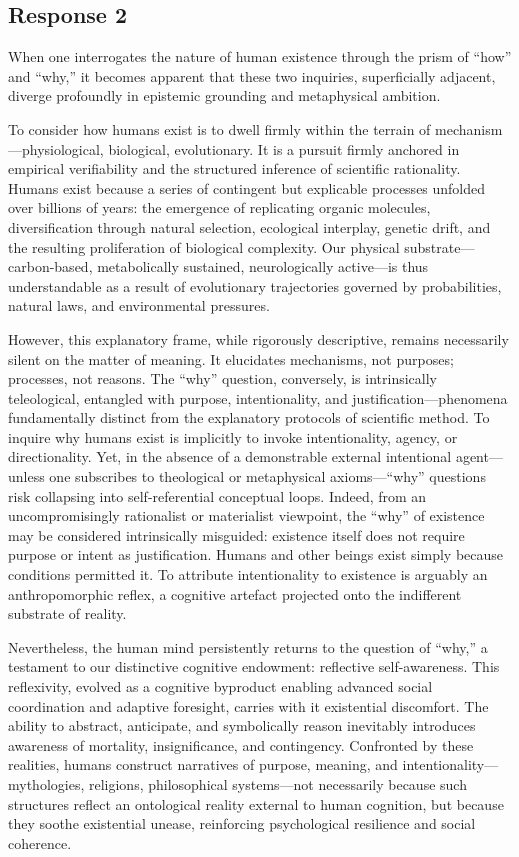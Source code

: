 \documentclass[
  10pt,
]{article}
\begin{document}
\subsection{Response 2}\label{response-2-1}

When one interrogates the nature of human existence through the prism of
``how'' and ``why,'' it becomes apparent that these two inquiries,
superficially adjacent, diverge profoundly in epistemic grounding and
metaphysical ambition.

To consider how humans exist is to dwell firmly within the terrain of
mechanism---physiological, biological, evolutionary. It is a pursuit
firmly anchored in empirical verifiability and the structured inference
of scientific rationality. Humans exist because a series of contingent
but explicable processes unfolded over billions of years: the emergence
of replicating organic molecules, diversification through natural
selection, ecological interplay, genetic drift, and the resulting
proliferation of biological complexity. Our physical
substrate---carbon-based, metabolically sustained, neurologically
active---is thus understandable as a result of evolutionary trajectories
governed by probabilities, natural laws, and environmental pressures.

However, this explanatory frame, while rigorously descriptive, remains
necessarily silent on the matter of meaning. It elucidates mechanisms,
not purposes; processes, not reasons. The ``why'' question, conversely,
is intrinsically teleological, entangled with purpose, intentionality,
and justification---phenomena fundamentally distinct from the
explanatory protocols of scientific method. To inquire why humans exist
is implicitly to invoke intentionality, agency, or directionality. Yet,
in the absence of a demonstrable external intentional agent---unless one
subscribes to theological or metaphysical axioms---``why'' questions
risk collapsing into self-referential conceptual loops. Indeed, from an
uncompromisingly rationalist or materialist viewpoint, the ``why'' of
existence may be considered intrinsically misguided: existence itself
does not require purpose or intent as justification. Humans and other
beings exist simply because conditions permitted it. To attribute
intentionality to existence is arguably an anthropomorphic reflex, a
cognitive artefact projected onto the indifferent substrate of reality.

Nevertheless, the human mind persistently returns to the question of
``why,'' a testament to our distinctive cognitive endowment: reflective
self-awareness. This reflexivity, evolved as a cognitive byproduct
enabling advanced social coordination and adaptive foresight, carries
with it existential discomfort. The ability to abstract, anticipate, and
symbolically reason inevitably introduces awareness of mortality,
insignificance, and contingency. Confronted by these realities, humans
construct narratives of purpose, meaning, and
intentionality---mythologies, religions, philosophical systems---not
necessarily because such structures reflect an ontological reality
external to human cognition, but because they soothe existential unease,
reinforcing psychological resilience and social coherence.
\end{document}
